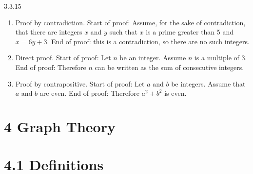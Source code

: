\documentclass[11pt,]{book}
\theoremstyle{ptxplainnotitle}
\theoremstyle{ptxplaintitle}
\theoremstyle{ptxdefinitionnotitle}
\theoremstyle{ptxdefinitiontitle}
\theoremstyle{ptxdefinitionnotitle}
\theoremstyle{ptxdefinitiontitle}
\theoremstyle{ptxdefinitionnotitle}
\theoremstyle{ptxdefinitiontitle}
\theoremstyle{ptxdefinitiontitlenonumber}
\theoremstyle{ptxdefinitiontitlenonumber}
\numberwithin{equation}{chapter}
\begin{document}
\begin{divisionexercise}{3.3.15}
\textbf{}\hypertarget{p-2447}{}%
\leavevmode%
\begin{enumerate}[label=(\alph*)]
\item\hypertarget{li-1160}{}\hypertarget{p-2448}{}%
Proof by contradiction. Start of proof: Assume, for the sake of contradiction, that there are integers \(x\) and \(y\) such that \(x\) is a prime greater than 5 and \(x = 6y + 3\). End of proof: \textellipsis{} this is a contradiction, so there are no such integers.%
\item\hypertarget{li-1161}{}\hypertarget{p-2449}{}%
Direct proof. Start of proof: Let \(n\) be an integer. Assume \(n\) is a multiple of 3. End of proof: Therefore \(n\) can be written as the sum of consecutive integers.%
\item\hypertarget{li-1162}{}\hypertarget{p-2450}{}%
Proof by contrapositive. Start of proof: Let \(a\) and \(b\) be integers. Assume that \(a\) and \(b\) are even. End of proof: Therefore \(a^2 + b^2\) is even.%
\end{enumerate}
%
\end{divisionexercise}%
\section*{4 Graph Theory}
\section*{4.1 Definitions}
\end{document}
